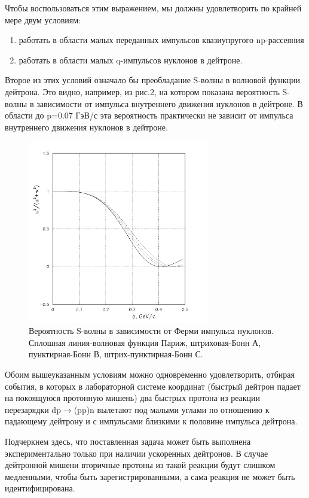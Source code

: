 \documentclass[a4paper,12pt]{article}
\begin{document}
Чтобы воспользоваться этим выражением, мы должны удовлетворить по крайней мере
двум условиям:
\begin{enumerate}
\item{работать в области малых переданных импульсов квазиупругого
  np-рассеяния}
\item{работать в области малых q-импульсов нуклонов в дейтроне.}
\end{enumerate}

Второе из этих условий означало бы преобладание S-волны в волновой функции
дейтрона. Это видно, например, из рис.2, на котором показана вероятность
S-волны в зависимости от импульса внутреннего движения нуклонов в дейтроне. В
области до p=0.07 ГэВ/с эта вероятность практически не зависит от импульса
внутреннего движения нуклонов в дейтроне.

\begin{figure}[h]
  \begin{center}
    \includegraphics[width=8cm]{wavedtr.pdf}
    \caption {Вероятность S-волны в зависимости от Ферми импульса
      нуклонов. Сплошная линия-волновая функция Париж, штриховая-Бонн А,
      пунктирная-Бонн В, штрих-пунктирная-Бонн С.}
  \end{center}
\end{figure}

Обоим вышеуказанным условиям можно одновременно удовлетворить, отбирая события,
в которых в лабораторной системе координат (быстрый дейтрон падает на покоящуюся
протонную мишень) два быстрых протона из реакции перезарядки dp$\to$(pp)n
вылетают под малыми углами по отношению к падающему дейтрону и с импульсами
близкими к половине импульса дейтрона.

Подчеркнем здесь, что поставленная задача может быть выполнена экспериментально
только при наличии ускоренных дейтронов. В случае дейтронной мишени вторичные
протоны из такой реакции будут слишком медленными, чтобы быть
зарегистрированными, а сама реакция не может быть идентифицирована.
\end{document}
